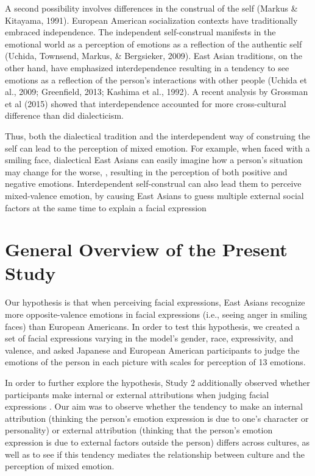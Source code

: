 \documentclass[english,man]{apa6}
\begin{document}
A second possibility involves differences in the construal of the self
(Markus \& Kitayama, 1991). European American socialization contexts
have traditionally embraced independence. The independent self-construal
manifests in the emotional world as a perception of emotions as a
reflection of the authentic self (Uchida, Townsend, Markus, \&
Bergsieker, 2009). East Asian traditions, on the other hand, have
emphasized interdependence resulting in a tendency to see emotions as a
reflection of the person's interactions with other people (Uchida et
al., 2009; Greenfield, 2013; Kashima et al., 1992). A recent analysis by
Grossman et al (2015) showed that interdependence accounted for more
cross-cultural difference than did dialecticism.

Thus, both the dialectical tradition and the interdependent way of
construing the self can lead to the perception of mixed emotion. For
example, when faced with a smiling face, dialectical East Asians can
easily imagine how a person's situation may change for the worse, ,
resulting in the perception of both positive and negative emotions.
Interdependent self-construal can also lead them to perceive
mixed-valence emotion, by causing East Asians to guess multiple external
social factors at the same time to explain a facial expression

\section{General Overview of the Present
Study}\label{general-overview-of-the-present-study}

Our hypothesis is that when perceiving facial expressions, East Asians
recognize more opposite-valence emotions in facial expressions (i.e.,
seeing anger in smiling faces) than European Americans. In order to test
this hypothesis, we created a set of facial expressions varying in the
model's gender, race, expressivity, and valence, and asked Japanese and
European American participants to judge the emotions of the person in
each picture with scales for perception of 13 emotions.

In order to further explore the hypothesis, Study 2 additionally
observed whether participants make internal or external attributions
when judging facial expressions . Our aim was to observe whether the
tendency to make an internal attribution (thinking the person's emotion
expression is due to one's character or personality) or external
attribution (thinking that the person's emotion expression is due to
external factors outside the person) differs across cultures, as well as
to see if this tendency mediates the relationship between culture and
the perception of mixed emotion.
\end{document}
